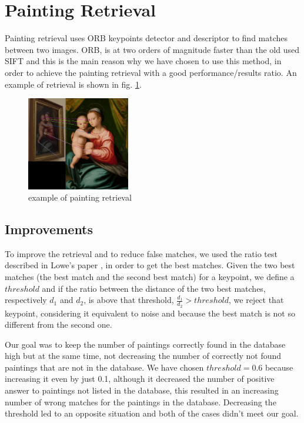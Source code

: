 \section{Painting Retrieval}
Painting retrieval uses ORB \cite{orb} keypoints detector and descriptor to find matches between two images. ORB, is at two orders of magnitude faster than the old used SIFT \cite{sift} and this is the main reason why we have chosen to use this method, in order to achieve the painting retrieval with a good performance/results ratio.
An example of retrieval is shown in fig. \ref{fig:retrieval_ex}.
\begin{figure}[h!]
  \centering
      \includegraphics[width=0.4\textwidth]{pictures/painting_retrieval/retrieval}
  \caption{example of painting retrieval}
  \label{fig:retrieval_ex}
\end{figure}

\subsection{Improvements}
To improve the retrieval and to reduce false matches, we used the ratio test described in Lowe's paper \cite{sift}, in order to get the best matches. Given the two best matches (the best match and the second best match) for a keypoint, we define a \(threshold\) and if the ratio between the distance of the two best matches, respectively \(d_1\) and \(d_2\), is above that threshold, \(\frac{d_1}{d_2}>threshold\), we reject that keypoint, considering it equivalent to noise and because the best match is not so different from the second one.

Our goal was to keep the number of paintings correctly found in the database high but at the same time, not decreasing the number of correctly not found paintings that are not in the database. We have chosen \(threshold = 0.6\) because increasing it even by just 0.1, although it decreased the number of positive answer to paintings not listed in the database, this resulted in an increasing number of wrong matches for the paintings in the database. Decreasing the threshold led to an opposite situation and both of the cases didn't meet our goal.

